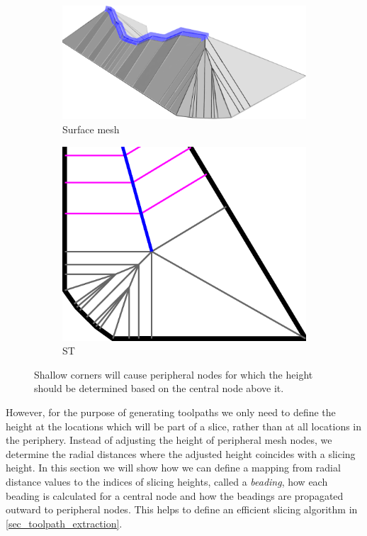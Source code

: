 \begin{figure}\centering
\setlength{\figheight}{.2\columnwidth}
\begin{subfigure}{.55\columnwidth}\centering
\includegraphics[height=\figheight]{sources/method/peripheral_heights_3D.png}
\caption{Surface mesh}
\end{subfigure}
\begin{subfigure}{.4\columnwidth}\centering
\includegraphics[height=\figheight]{sources/method/peripheral_heights.pdf}
\caption{ST}
\end{subfigure}
\caption{
Shallow corners will cause peripheral nodes for which the height should be determined based on the central node above it.
}
\label{peripheral_heights}
\end{figure}



However, for the purpose of generating toolpaths we only need to define the height at the locations which will be part of a slice, rather than at all locations in the periphery.
Instead of adjusting the height of peripheral mesh nodes, we determine the radial distances where the adjusted height coincides with a slicing height.
In this section we will show how we can define a mapping from radial distance values to the indices of slicing heights, called a \emph{beading},
how each beading is calculated for a central node
and how the beadings are propagated outward to peripheral nodes.
This helps to define an efficient slicing algorithm in \cref{sec_toolpath_extraction}.

